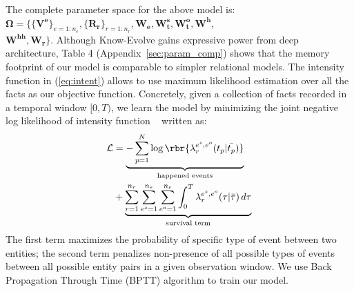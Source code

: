 \documentclass{article}
\begin{document}
The complete parameter space for the above model is: \\$\mathbf{\Omega} = \{\{\mathbf{V^e}\}_{e=1:n_e}, \{\mathbf{R_r}\}_{r=1:n_r}, \mathbf{W_e},\mathbf{W^{s}_t},\mathbf{W^{o}_t},\mathbf{W^h},$\\$\mathbf{W^{hh}},\mathbf{W_r}\}.$ 
Although Know-Evolve gains expressive power from deep architecture, 
Table 4 (Appendix~\ref{sec:param_comp}) shows that the memory footprint of our model is comparable to simpler relational models.
The intensity function in (\ref{eq:intent}) allows to use maximum likelihood estimation over all the facts as our objective function. Concretely, given a collection of facts recorded in a temporal window $[0,T)$, we learn the model by minimizing the joint negative log likelihood of intensity function ~\citep{DalVer2007} written as:
\vspace{-0.3cm}
\begin{equation}
\label{eq:data_loglikelihood}
\begin{split}
\mathcal{L} &= \underbrace{- \sum_{p=1}^N \log\rbr{\lambda^{e^s,e^o}_r(t_p|\bar{t_p})}}_{\text{happened events}}\\ &+ \underbrace{\sum_{r=1}^{n_r}\sum_{e^s=1}^{n_e}\sum_{e^o=1}^{n_e}\int_0^T \lambda^{e^s,e^o}_{r}(\tau|\bar{\tau})\, d \tau}_{\text{survival term}}
\end{split}
\end{equation}
The first term maximizes the probability of specific type of event between two entities; the second term  penalizes non-presence of all possible types of events between all possible entity pairs in a given observation window. We  use  Back Propagation Through Time (BPTT) algorithm to train our model. 
\end{document}
